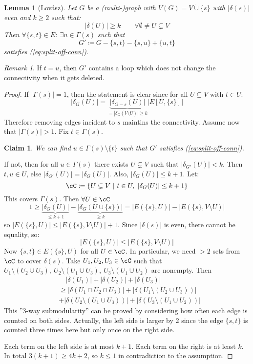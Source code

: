 \documentclass[11pt, a4paper]{article}
\newcommand{\abs}[1]{\left\lvert#1\right\rvert}
\newcommand{\set}[1]{\{#1\}}
\newtheorem{lemma}[theorem]{Lemma}
\newtheorem*{claim}{Claim}
\theoremstyle{remark}
\newtheorem*{uremark}{Remark}
\theoremstyle{definition}
\begin{document}
\begin{lemma}[Lovász]\label{lemma:splitting-off}
	Let $G$ be a (multi-)graph with $V(G)=V\dot\cup\set{s}$ with $\abs{\delta(s)}$
	even and $k\geq2$ such that:
	\begin{equation}\label{eq:split-off-conn}
		\abs{\delta(U)}\geq k \qquad\forall\emptyset \neq U\subsetneq V
	\end{equation}
	Then $\forall\set{s,t}\in E:\ \exists u\in\Gamma(s)$ such that
	\[G'\coloneqq G-\set{s,t}-\set{s,u}+\set{u,t}\]
	satisfies (\ref{eq:split-off-conn}).
\end{lemma}
\begin{uremark}
	If $t=u$, then $G'$ contains a loop which does not change the connectivity
	when it gets deleted.
\end{uremark}
\begin{proof}
	If $\abs{\Gamma(s)}=1$, then the statement is clear since for all $U\subsetneq
	V$ with $t\in U$:
	\[\abs{\delta_G(U)}=\underbrace{\abs{\delta_{G-s}(U)}}_{=\abs{\delta_G(V\setminus U)}\geq k}
		\abs{E[U,\set{s}]}\]
	Therefore removing edges incident to $s$ maintins the connectivity.
	Assume now that $\abs{\Gamma(s)}>1$. Fix $t\in\Gamma(s)$.
	\begin{claim}
		We can find $u\in\Gamma(s)\setminus\set{t}$ such that $G'$ satisfies
		(\ref{eq:split-off-conn}).
	\end{claim}
	If not, then for all $u\in\Gamma(s)$ there exists $U\subsetneq V$ such
	that $\abs{\delta_{G'}(U)}<k$. Then $t,u\in U$, else $\abs{\delta_{G'}(U)}
	=\abs{\delta_G(U)}$. Also, $\abs{\delta_G(U)}\leq k+1$. Let:
	\[\cC\coloneqq\set{U\subsetneq V\ |\ t\in U,\ \abs{\delta_G(U)}\leq k+1}\]
	This covers $\Gamma(s)$. Then $\forall U\in\cC$
	\[1\geq \underbrace{\abs{\delta_G(U)}}_{\leq k+1}
		-\underbrace{\abs{\delta_G(U\cup\set{s})}}_{\geq k}
		=\abs{E(\set{s}, U)}-\abs{E(\set{s}, V\setminus U)}\]
	so $\abs{E(\set{s}, U)}\leq \abs{E(\set{s}, V\setminus U)}+1$. Since
	$\abs{\delta(s)}$ is even, there cannot be equality, so:
	\[\abs{E(\set{s}, U)}\leq \abs{E(\set{s}, V\setminus U)}\]
	Now $\set{s,t}\in E(\set{s}, U)$ for all $U\in\cC$. In particular,
	we need $>2$ sets from $\cC$ to cover $\delta(s)$. Take $U_1,U_2,U_3\in\cC$
	such that $U_1\setminus(U_2\cup U_3),\ U_2\setminus(U_1\cup U_3),\ U_3
	\setminus(U_1\cup U_2)$ are nonempty. Then
	\begin{align*}
		&\quad\abs{\delta(U_1)}+\abs{\delta(U_2)}+\abs{\delta(U_3)} \\
		&\geq \abs{\delta(U_1\cap U_2\cap U_3)}+\abs{\delta(U_1\setminus(U_2\cup U_3))} \\
		&+\abs{\delta(U_2\setminus(U_1\cup U_3))}+\abs{\delta(U_3\setminus(U_1\cup U_2))}
	\end{align*}
	This ''3-way submodularity'' can be proved by considering how
	often each edge is counted on both sides. Actually, the left
	side is larger by 2 since the edge $\set{s,t}$ is counted three
	times here but only once on the right side.

	Each term on the left side is at most $k+1$. Each term on the right is
	at least $k$. In total $3(k+1)\geq 4k+2$, so $k\leq 1$ in contradiction
	to the assumption.
\end{proof}
\end{document}
